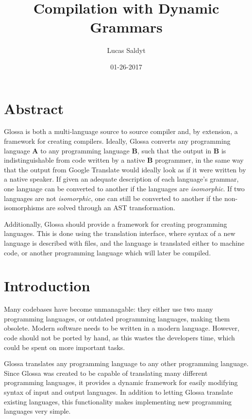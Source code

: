 \documentclass{article}
\title{Compilation with Dynamic Grammars}
\date{01-26-2017}
\author{Lucas Saldyt}
\begin{document}
\maketitle
{}
\newpage
{}

\section{Abstract}
Glossa is both a multi-language source to source compiler and, by extension, a framework for creating compilers.
Ideally, Glossa converts any programming language \textbf{A} to any programming language \textbf{B}, such that the output in \textbf{B} is indistinguishable from code written by a native \textbf{B} programmer, in the same way that the output from Google Translate would ideally look as if it were written by a native speaker.
If given an adequate description of each language's grammar, one language can be converted to another if the languages are \textit{isomorphic}.
If two languages are not \textit{isomorphic}, one can still be converted to another if the non-isomorphisms are solved through an AST transformation.

Additionally, Glossa should provide a framework for creating programming languages.
This is done using the translation interface, where syntax of a new language is described with files, and the language is translated either to machine code, or another programming language which will later be compiled.

\section{Introduction}

Many codebases have become unmanagable: they either use two many programming languages, or outdated programming languages, making them obsolete.
Modern software needs to be written in a modern language. However, code should not be ported by hand, as this wastes the developers time, which could be spent on more important tasks.

Glossa translates any programming language to any other programming language.
Since Glossa was created to be capable of translating many different programming languages, it provides a dynamic framework for easily modifying syntax of input and output languages. 
In addition to letting Glossa translate existing languages, this functionality makes implementing new programming languages very simple.
\end{document}
